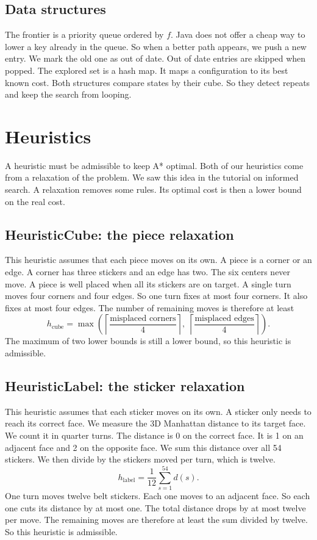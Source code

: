 \documentclass[11pt,a4paper]{article}
\begin{document}
\subsection{Data structures}

The frontier is a priority queue ordered by $f$. Java does not offer a cheap way
to lower a key already in the queue. So when a better path appears, we push a new
entry. We mark the old one as out of date. Out of date entries are skipped when
popped. The explored set is a hash map. It maps a configuration to its best known
cost. Both structures compare states by their cube. So they detect repeats and
keep the search from looping.

\section{Heuristics}

A heuristic must be admissible to keep A* optimal. Both of our heuristics come
from a relaxation of the problem. We saw this idea in the tutorial on informed
search. A relaxation removes some rules. Its optimal cost is then a lower bound on
the real cost.

\subsection{HeuristicCube: the piece relaxation}

This heuristic assumes that each piece moves on its own. A piece is a corner or an
edge. A corner has three stickers and an edge has two. The six centers never move.
A piece is well placed when all its stickers are on target. A single turn moves
four corners and four edges. So one turn fixes at most four corners. It also fixes
at most four edges. The number of remaining moves is therefore at least
\[
h_{\text{cube}} = \max\left(
\left\lceil \frac{\text{misplaced corners}}{4} \right\rceil,\;
\left\lceil \frac{\text{misplaced edges}}{4} \right\rceil
\right).
\]
The maximum of two lower bounds is still a lower bound, so this heuristic is
admissible.

\subsection{HeuristicLabel: the sticker relaxation}

This heuristic assumes that each sticker moves on its own. A sticker only needs to
reach its correct face. We measure the 3D Manhattan distance to its target face.
We count it in quarter turns. The distance is 0 on the correct face. It is 1 on an
adjacent face and 2 on the opposite face. We sum this distance over all 54
stickers. We then divide by the stickers moved per turn, which is twelve.
\[
h_{\text{label}} = \frac{1}{12} \sum_{s=1}^{54} d(s).
\]
One turn moves twelve belt stickers. Each one moves to an adjacent face. So each
one cuts its distance by at most one. The total distance drops by at most twelve
per move. The remaining moves are therefore at least the sum divided by twelve. So
this heuristic is admissible.
\end{document}

